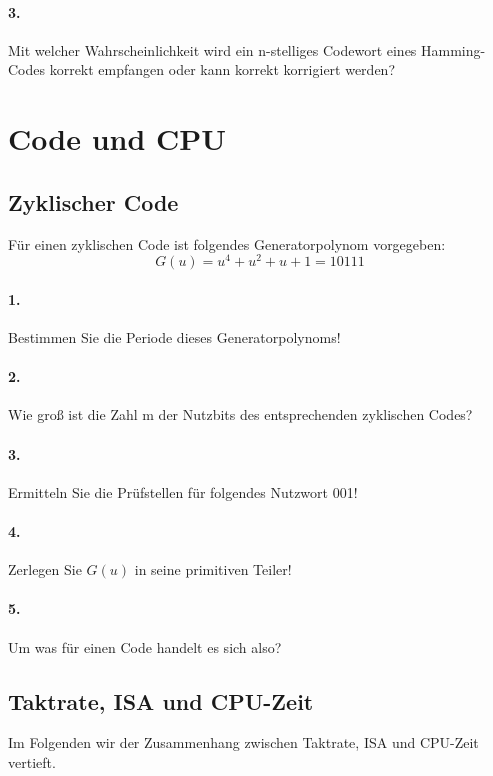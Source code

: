 \documentclass[paper=a4, fontsize=11pt]{scrartcl}
\numberwithin{equation}{section}
\numberwithin{figure}{section}
\numberwithin{table}{section}
\begin{document}
\paragraph{3.}
Mit welcher Wahrscheinlichkeit wird ein n-stelliges Codewort eines Hamming-Codes korrekt empfangen oder kann korrekt korrigiert werden?

\section{Code und CPU}
\subsection{Zyklischer Code}
Für einen zyklischen Code ist folgendes Generatorpolynom vorgegeben:
$$G(u)=u^{4}+u^{2}+u+1=10111$$

\paragraph{1.}
Bestimmen Sie die Periode dieses Generatorpolynoms!

\paragraph{2.}
Wie groß ist die Zahl m der Nutzbits des entsprechenden zyklischen Codes?

\paragraph{3.}
Ermitteln Sie die Prüfstellen für folgendes Nutzwort 001!

\paragraph{4.}
Zerlegen Sie $G(u)$ in seine primitiven Teiler!

\paragraph{5.}
Um was für einen Code handelt es sich also?

\subsection{Taktrate, ISA und CPU-Zeit}
Im Folgenden wir der Zusammenhang zwischen Taktrate, ISA und CPU-Zeit vertieft.
\end{document}
